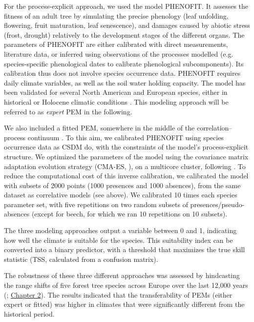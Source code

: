 \documentclass[letterpaper,8pt]{extarticle}  %
\begin{document}
\begin{doublespacing}
\begin{linenumbers}
For the process-explicit approach, we used the model PHENOFIT. It assesses the fitness of an adult tree by simulating the precise phenology (leaf unfolding, flowering, fruit maturation, leaf senescence), and damages caused by abiotic stress (frost, drought) relatively to the development stages of the different organs. The parameters of PHENOFIT are either calibrated with direct measurements, literature data, or inferred  using observations of the processes modelled (e.g. species-specific phenological dates to calibrate phenological subcomponents). Its calibration thus does not involve species occurrence data. PHENOFIT requires daily climate variables, as well as the soil water holding capacity. The model has been validated for several North American and European species, either in historical or Holocene climatic conditions \citep{Morin2007, Saltre2013, Duputie2015, Gauzere2020, VanderMeersch2024}. This modeling approach will be referred to as \emph{expert} PEM in the following.

We also included a fitted PEM, somewhere in the middle of the correlation–process continuum \citep{Dormann2012}. To this aim, we calibrated PHENOFIT using species occurrence data as CSDM do, with the constraints of the model's process-explicit structure. We optimized the parameters of the model using the covariance matrix adaptation evolution strategy (CMA-ES, \citep{Hansen2001}), on a multicore cluster, following \citet{VanderMeersch2023}. To reduce the computational cost of this inverse calibration, we calibrated the model with subsets of 2000 points (1000 presences and 1000 absences), from the same dataset as correlative models (see above). We calibrated 10 times each species parameter set, with five repetitions on two random subsets of presences/pseudo-absences (except for beech, for which we ran 10 repetitions on 10 subsets).

The three modeling approaches output a variable between 0 and 1, indicating how well the climate is suitable for the species. This suitability index can be converted into a binary predictor, with a threshold that maximizes the true skill statistic (TSS, calculated from a confusion matrix). 

The robustness of these three different approaches was assessed by hindcasting the range shifts of five forest tree species across Europe over the last 12,000 years (\citealp{VanderMeersch2024}; \hyperref[chapter2]{Chapter 2}). The results indicated that the transferability of PEMs (either expert or fitted) was higher in climates that were significantly different from the historical period.


\end{linenumbers}
\end{doublespacing}
\end{document}

